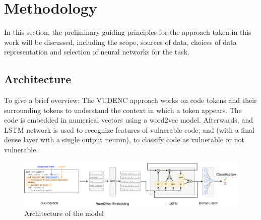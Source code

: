\documentclass[
a4paper,
pagesize,
pdftex,
12pt,
ngerman,
fleqn,
final,
]{scrartcl}
\begin{document}
	
	\newpage
	\section{Methodology}\label{Methodology}
	In this section, the  preliminary guiding principles for the approach taken in this work will be discussed, including the scope, sources of data, choices of data representation and selection of neural networks for the task. 
	
	\subsection{Architecture}
	To give a brief overview: The VUDENC approach works on code tokens and their surrounding tokens to understand the context in which a token appears. The code is embedded in numerical vectors using a word2vec model. Afterwards, and LSTM network is used to recognize features of vulnerable code, and (with a final dense layer with a single output neuron), to classify code as vulnerable or not vulnerable.  
	
	\begin{figure}[ht]
		\centering
		\includegraphics[width=\linewidth]{img/Architecture}
		\caption{Architecture of the model}
		\label{fig:architecture}
	\end{figure}
	
	
\end{document}
